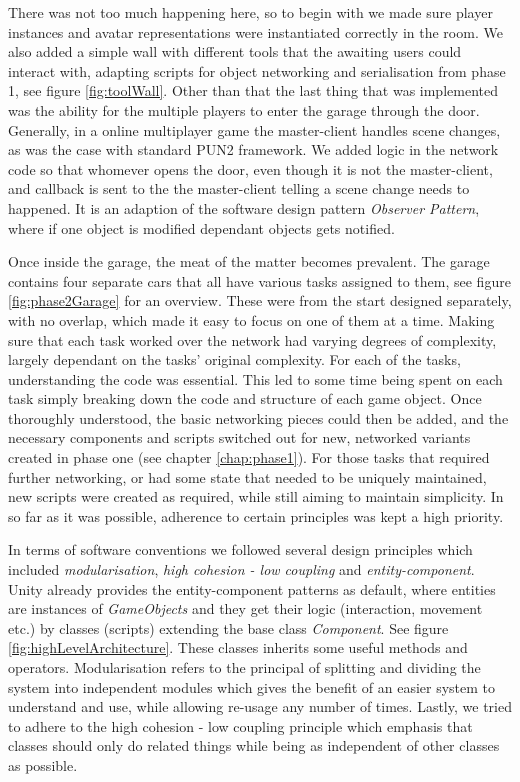 There was not too much happening here, so to begin with we made sure player instances and avatar representations were instantiated correctly in the room. We also added a simple wall with different tools that the awaiting users could interact with, adapting scripts for object networking and serialisation from phase 1, see figure \ref{fig:toolWall}. Other than that the last thing that was implemented was the ability for the multiple players to enter the garage through the door. Generally, in a online multiplayer game the master-client  handles scene changes, as was the case with standard PUN2 framework. We added logic in the network code so that whomever opens the door, even though it is not the master-client, and callback is sent to the the master-client telling a scene change needs to happened. It is an adaption of the software design pattern \textit{Observer Pattern}, where if one object is modified dependant objects gets notified.    



Once inside the garage, the meat of the matter becomes prevalent. The garage contains four separate cars that all have various tasks assigned to them, see figure \ref{fig:phase2Garage} for an overview. These were from the start designed separately, with no overlap, which made it easy to focus on one of them at a time. Making sure that each task worked over the network had varying degrees of complexity, largely dependant on the tasks' original complexity. For each of the tasks, understanding the code was essential. This led to some time being spent on each task simply breaking down the code and structure of each game object. Once thoroughly understood, the basic networking pieces could then be added, and the necessary components and scripts switched out for new, networked variants created in phase one (see chapter \ref{chap:phase1}). For those tasks that required further networking, or had some state that needed to be uniquely maintained, new scripts were created as required, while still aiming to maintain simplicity.  In so far as it was possible, adherence to certain principles was kept a high priority. 

In terms of software conventions we followed several design principles which included \textit{ modularisation}, \textit{high cohesion - low coupling} and \textit{ entity-component}. Unity already provides the entity-component patterns as default, where entities are instances of \textit{GameObjects} and they get their logic (interaction, movement etc.) by classes (scripts) extending the base class \textit{Component}. See figure \ref{fig:highLevelArchitecture}. These classes inherits some useful methods and operators. 
Modularisation refers to the principal of splitting and dividing the system into independent modules which gives the benefit of an easier system to understand and use, while allowing re-usage any number of times. Lastly, we tried to adhere to the high cohesion - low coupling principle which emphasis that classes should only do related things while being as independent of other classes as possible.    


